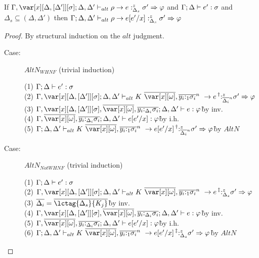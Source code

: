 \begin{sublemma}
If $\G,\xD; \D,\D' \vdash_{alt} \rho \to e :^z_{\Delta_s} \s' \Rightarrow \vp$ and
    $\Gamma; \Delta \vdash e' : \sigma$ and $\Delta_s \subseteq (\Delta,\Delta')$ then $\Gamma; \Delta, \Delta' \vdash_{alt} \rho \to e[e'/x] :^z_{\Delta_s} \sigma' \Rightarrow \varphi$
\end{sublemma}

\begin{proof}
By structural induction on the $alt$ judgment.

\begin{description}
\item[Case:] $AltN_{WHNF}$ (trivial induction)
\begin{tabbing}
  (1) $\Gamma; \Delta \vdash e' : \sigma$\\
  (2) $\G,\xD; \D,\D' \vdash_{alt} \konstructor~\to e \prescript{\dag}{}{:^z_{\ov{\D_i}^n}} \s' \Rightarrow \vp$\\
  (3) $\G,\xD,\ov{\xo},\ov{y_i{:}_{\D_i}\s_i}; \D, \D' \vdash e : \vp$\` by inv.\\
  (4) $\G,\ov{\xo},\ov{y_i{:}_{\D_i}\s_i}; \D, \D' \vdash e[e'/x] : \vp$\` by i.h.\\
  (5) $\G; \D,\D' \vdash_{alt} \konstructor~\to e[e'/x] \prescript{\dag}{}{:^z_{\ov{\D_i}^n}} \s' \Rightarrow \vp$\` by $AltN$\\
\end{tabbing}

\item[Case:] $AltN_{Not WHNF}$ (trivial induction)
\begin{tabbing}
  (1) $\Gamma; \Delta \vdash e' : \sigma$\\
  (2) $\G,\xD; \D,\D' \vdash_{alt} \konstructor~\to e \prescript{\ddag}{}{:^z_{\D_s}} \s' \Rightarrow \vp$\\
  (3) $\ov{\D_i} = \ov{\lctag{\D_s}{K_j}}$\`by inv.\\
  (4) $\G,\xD,\ov{\xo},\ov{y_i{:}_{\D_i}\s_i}; \D, \D' \vdash e : \vp$\` by inv.\\
  (5) $\G,\ov{\xo},\ov{y_i{:}_{\D_i}\s_i}; \D, \D' \vdash e[e'/x] : \vp$\` by i.h.\\
  (6) $\G; \D,\D' \vdash_{alt} \konstructor~\to e[e'/x] \prescript{\ddag}{}{:^z_{\D_s}} \s' \Rightarrow \vp$\` by $AltN$\\
\end{tabbing}


\end{description}
\end{proof}
